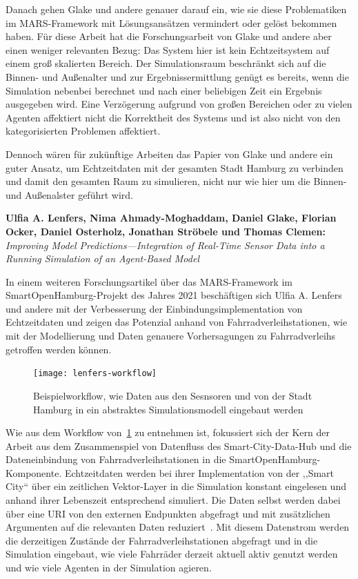 Danach gehen Glake und andere genauer darauf ein, wie sie diese Problematiken im MARS-Framework mit Lösungsansätzen vermindert oder gelöst bekommen haben.
Für diese Arbeit hat die Forschungsarbeit von Glake und andere aber einen weniger relevanten Bezug:
Das System hier ist kein Echtzeitsystem auf einem groß skalierten Bereich.
Der Simulationsraum beschränkt sich auf die Binnen- und Außenalter und zur Ergebnissermittlung genügt es bereits, wenn die Simulation nebenbei berechnet und nach einer beliebigen Zeit ein Ergebnis ausgegeben wird.
Eine Verzögerung aufgrund von großen Bereichen oder zu vielen Agenten affektiert nicht die Korrektheit des Systems und ist also nicht von den kategorisierten Problemen affektiert.

Dennoch wären für zukünftige Arbeiten das Papier von Glake und andere ein guter Ansatz, um Echtzeitdaten mit der gesamten Stadt Hamburg zu verbinden und damit den gesamten Raum zu simulieren, nicht nur wie hier um die Binnen- und Außenalster geführt wird.


\textbf{Ulfia A. Lenfers, Nima Ahmady-Moghaddam, Daniel Glake, Florian Ocker, Daniel Osterholz, Jonathan Ströbele und Thomas Clemen:}
\textit{Improving Model Predictions—Integration of Real-Time Sensor Data into a Running Simulation of an Agent-Based Model}

In einem weiteren Forschungsartikel über das MARS-Framework im SmartOpenHamburg-Projekt des Jahres 2021 beschäftigen sich Ulfia A. Lenfers und andere mit der Verbesserung der Einbindungsimplementation von Echtzeitdaten und zeigen das Potenzial anhand von Fahrradverleihstationen, wie mit der Modellierung und Daten genauere Vorhersagungen zu Fahrradverleihs getroffen werden können.

\begin{figure}[h]
    \centering
    \texttt{[image: lenfers-workflow]}~\caption{Beispielworkflow, wie Daten aus den Sesnsoren und von der Stadt Hamburg in ein abstraktes Simulationsmodell eingebaut werden~\cite{Lenfers-MP-2021}}
    \label{fig:lenfers-workflow-sensors}
\end{figure}

Wie aus dem Workflow von~\ref{fig:lenfers-workflow-sensors} zu entnehmen ist, fokussiert sich der Kern der Arbeit aus dem Zusammenspiel von Datenfluss des Smart-City-Data-Hub und die Dateneinbindung von Fahrradverleihstationen in die SmartOpenHamburg-Komponente.
Echtzeitdaten werden bei ihrer Implementation von der ,,Smart City`` über ein zeitlichen Vektor-Layer in die Simulation konstant eingelesen und anhand ihrer Lebenszeit entsprechend simuliert\cite{Lenfers-MP-2021}.
Die Daten selbst werden dabei über eine URI von den externen Endpunkten abgefragt und mit zusätzlichen Argumenten auf die relevanten Daten reduziert~.
Mit diesem Datenstrom werden die derzeitigen Zustände der Fahrradverleihstationen abgefragt und in die Simulation eingebaut, wie viele Fahrräder derzeit aktuell aktiv genutzt werden und wie viele Agenten in der Simulation agieren\cite{Lenfers-MP-2021}.

